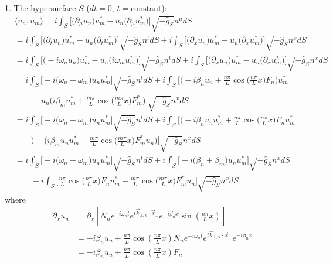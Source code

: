 \documentclass[english]{article}
\begin{document}
1. The hypersurface $S$ ($dt=0$, $t=\text{constant}$): 
\begin{align*}
 & \langle u_{n},u_{m}\rangle=i\int_{S}\biggl[\biggl(\partial_{\mu}u_{n}\biggr)u^{*}_{m}-u_{n}\biggl(\partial_{\mu}u^{*}_{m}\biggr)\biggr]\sqrt{-\hat{g}_{S}}n^{\mu}dS\\
 & =i\int_{S}\biggl[\biggl(\partial_{t}u_{n}\biggr)u^{*}_{m}-u_{n}\biggl(\partial_{t}u^{*}_{m}\biggr)\biggr]\sqrt{-\hat{g}_{S}}n^{t}dS+i\int_{S}\biggl[\biggl(\partial_{x}u_{n}\biggr)u^{*}_{m}-u_{n}\biggl(\partial_{x}u^{*}_{m}\biggr)\biggr]\sqrt{-\hat{g}_{S}}n^{x}dS\\
 & =i\int_{S}\biggl[\biggl(-i\omega_{n}u_{n}\biggr)u^{*}_{m}-u_{n}\biggl(i\omega_{m}u^{*}_{m}\biggr)\biggr]\sqrt{-\hat{g}_{S}}n^{t}dS+i\int_{S}\biggl[\biggl(\partial_{x}u_{n}\biggr)u^{*}_{m}-u_{n}\biggl(\partial_{x}u^{*}_{m}\biggr)\biggr]\sqrt{-\hat{g}_{S}}n^{x}dS\\
 & =i\int_{S}\biggl[-i\biggl(\omega_{n}+\omega_{m}\biggr)u_{n}u^{*}_{m}\biggr]\sqrt{-\hat{g}_{S}}n^{t}dS+i\int_{S}\biggl[\biggl(-i\beta_{n}u_{n}+\frac{n\pi}{L}\cos\biggl(\frac{n\pi}{L}x\biggr)F_{n}\biggr)u^{*}_{m}\\
 & \qquad-u_{n}\biggl(i\beta_{m}u^{*}_{m}+\frac{m\pi}{L}\cos\biggl(\frac{m\pi}{L}x\biggr)F^{*}_{m}\biggr)\biggr]\sqrt{-\hat{g}_{S}}n^{x}dS\\
 & =i\int_{S}\biggl[-i\biggl(\omega_{n}+\omega_{m}\biggr)u_{n}u^{*}_{m}\biggr]\sqrt{-\hat{g}_{S}}n^{t}dS+i\int_{S}\biggl[\biggl(-i\beta_{n}u_{n}u^{*}_{m}+\frac{n\pi}{L}\cos\biggl(\frac{n\pi}{L}x\biggr)F_{n}u^{*}_{m}\\
 & \qquad\biggr)-\biggl(i\beta_{m}u_{n}u^{*}_{m}+\frac{m\pi}{L}\cos\biggl(\frac{m\pi}{L}x\biggr)F^{*}_{m}u_{n}\biggr)\biggr]\sqrt{-\hat{g}_{S}}n^{x}dS\\
 & =i\int_{S}\biggl[-i\biggl(\omega_{n}+\omega_{m}\biggr)u_{n}u^{*}_{m}\biggr]\sqrt{-\hat{g}_{S}}n^{t}dS+i\int_{S}\biggl[-i\biggl(\beta_{n}+\beta_{m}\biggr)u_{n}u^{*}_{m}\biggr]\sqrt{-\hat{g}_{S}}n^{x}dS\\
 & \qquad+i\int_{S}\biggl[\frac{n\pi}{L}\cos\biggl(\frac{n\pi}{L}x\biggr)F_{n}u^{*}_{m}-\frac{m\pi}{L}\cos\biggl(\frac{m\pi}{L}x\biggr)F^{*}_{m}u_{n}\biggr]\sqrt{-\hat{g}_{S}}n^{x}dS
\end{align*}
 where 
\begin{align*}
\partial_{x}u_{n} & =\partial_{x}\left[N_{n}e^{-i\omega_{n}t}e^{i\vec{k}_{\bot,n}\cdot\vec{x}_{\bot}}e^{-i\beta_{n}x}\sin\left(\frac{n\pi}{L}x\right)\right]\\
 & =-i\beta_{n}u_{n}+\frac{n\pi}{L}\cos\left(\frac{n\pi}{L}x\right)N_{n}e^{-i\omega_{n}t}e^{i\vec{k}_{\bot,n}\cdot\vec{x}_{\bot}}e^{-i\beta_{n}x}\\
 & =-i\beta_{n}u_{n}+\frac{n\pi}{L}\cos\left(\frac{n\pi}{L}x\right)F_{n}
\end{align*}
\end{document}
